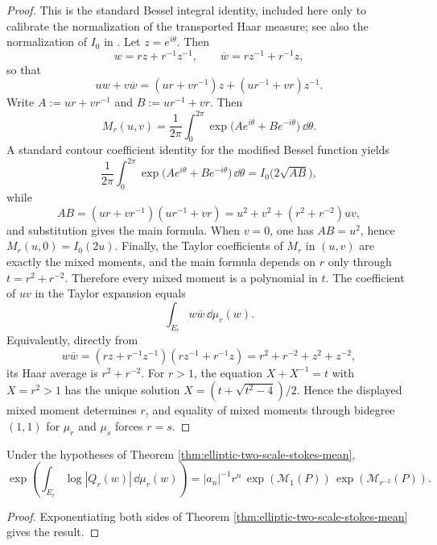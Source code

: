 \begin{proof}
This is the standard Bessel integral identity, included here only to calibrate the normalization of the transported Haar measure; see also the normalization of \(I_0\) in \citep[\S10.25]{NISTDLMF}. Let \(z=e^{i\theta}\). Then
\[
w=r z+r^{-1}z^{-1},\qquad \overline w=r z^{-1}+r^{-1}z,
\]
so that
\[
u w+v\overline w
=(ur+vr^{-1})z+(ur^{-1}+vr)z^{-1}.
\]
Write \(A:=ur+vr^{-1}\) and \(B:=ur^{-1}+vr\). Then
\[
M_r(u,v)=\frac1{2\pi}\int_0^{2\pi}\exp\!\bigl(Ae^{i\theta}+Be^{-i\theta}\bigr)\,\dd\theta.
\]
A standard contour coefficient identity for the modified Bessel function yields
\[
\frac1{2\pi}\int_0^{2\pi}\exp\!\bigl(Ae^{i\theta}+Be^{-i\theta}\bigr)\,\dd\theta
=I_0\!\bigl(2\sqrt{AB}\bigr),
\]
while
\[
AB=(ur+vr^{-1})(ur^{-1}+vr)=u^2+v^2+(r^2+r^{-2})uv,
\]
and substitution gives the main formula.
When \(v=0\), one has \(AB=u^2\), hence \(M_r(u,0)=I_0(2u)\).
Finally, the Taylor coefficients of \(M_r\) in \((u,v)\) are exactly the mixed moments, and the main formula depends on \(r\) only through \(t=r^2+r^{-2}\). Therefore every mixed moment is a polynomial in \(t\).
The coefficient of \(uv\) in the Taylor expansion equals
\[
\int_{E_r}w\overline w\,\dd\mu_r(w).
\]
Equivalently, directly from
\[
w\overline w=(rz+r^{-1}z^{-1})(rz^{-1}+r^{-1}z)
=r^2+r^{-2}+z^2+z^{-2},
\]
its Haar average is \(r^2+r^{-2}\). For \(r>1\), the equation \(X+X^{-1}=t\) with \(X=r^2>1\) has the unique solution \(X=(t+\sqrt{t^2-4})/2\). Hence the displayed mixed moment determines \(r\), and equality of mixed moments through bidegree \((1,1)\) for \(\mu_r\) and \(\mu_s\) forces \(r=s\).
\end{proof}

\begin{corollary}\label{cor:elliptic-two-scale-mahler-multiplicative}
Under the hypotheses of Theorem \ref{thm:elliptic-two-scale-stokes-mean},
\[
\exp\!\left(\int_{E_r}\log|Q_r(w)|\,\dd\mu_r(w)\right)
=
|a_n|^{-1}r^n\,\exp(\mathcal M_1(P))\,\exp(\mathcal M_{r^{-2}}(P)).
\]
\end{corollary}
\begin{proof}
Exponentiating both sides of Theorem \ref{thm:elliptic-two-scale-stokes-mean} gives the result.
\end{proof}

